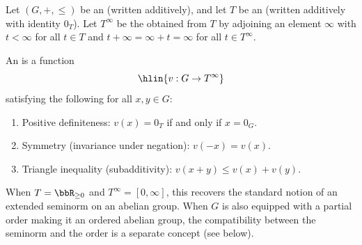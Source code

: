 \begin{definition} \label{definition:extended_seminorm_on_an_ordered_abelian_group_valued_in_an_ordered_commutative_monoid_with_adjoined_infinity}
    Let $(G, +, \leq)$ be an  (written additively), and let $T$ be an  (written additively with identity $0_T$). Let $T^\infty$ be the  obtained from $T$ by adjoining an element $\infty$ with $t < \infty$ for all $t \in T$ and $t + \infty = \infty + t = \infty$ for all $t \in T^\infty$.

An  is a function
$$\hlin{v : G \to T^\infty}$$
satisfying the following for all $x, y \in G$:
\begin{enumerate}
    \item Positive definiteness: $v(x) = 0_T$ if and only if $x = 0_G$.
    \item Symmetry (invariance under negation): $v(-x) = v(x)$.
    \item Triangle inequality (subadditivity): $v(x + y) \leq v(x) + v(y)$.
\end{enumerate}

When $T = \bbR_{\ge 0}$ and $T^\infty = [0, \infty]$, this recovers the standard notion of an extended seminorm on an abelian group. When $G$ is also equipped with a partial order making it an ordered abelian group, the compatibility between the seminorm and the order is a separate concept (see below).
\end{definition}